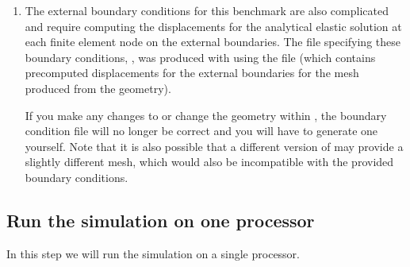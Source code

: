 \begin{enumerate}
  \begin{screen}
    \shellprompt{}
  \end{screen}
  
\item The external boundary conditions for this benchmark are also
  complicated and require computing the displacements for the
  analytical elastic solution at each finite element node on the
  external boundaries. The file specifying these boundary conditions,
  , was produced with  using
  the  file (which contains precomputed
  displacements for the external boundaries for the mesh produced from
  the  geometry).

  \begin{warning}
    If you make any changes to  or change the
    geometry within , the boundary condition file
     will no longer be correct and you will have
    to generate one yourself.  Note that it is also possible that a
    different version of  may provide a slightly
    different mesh, which would also be incompatible with the provided
    boundary conditions.
  \end{warning}
\end{enumerate}

\subsection{Run the simulation on one processor}

In this step we will run the simulation on a single processor.

